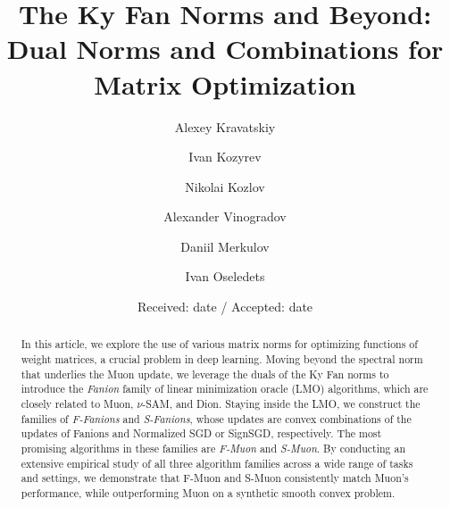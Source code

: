 \documentclass[smallextended,referee,envcountsect]{svjour3}
\begin{document}
\title{The Ky Fan Norms and Beyond: Dual Norms and Combinations for Matrix Optimization}

\author{Alexey Kravatskiy \and Ivan Kozyrev \and Nikolai Kozlov \and Alexander Vinogradov \and Daniil Merkulov \and Ivan Oseledets}


\date{Received: date / Accepted: date}

\maketitle

\begin{abstract}
   In this article, we explore the use of various matrix norms for optimizing functions of weight matrices, a crucial problem in deep learning. Moving beyond the spectral norm that underlies the Muon update, we leverage the duals of the Ky Fan norms to introduce the \emph{Fanion} family of linear minimization oracle (LMO) algorithms, which are closely related to Muon, $\nu$-SAM, and Dion. Staying inside the LMO, we construct the families of \emph{F-Fanions} and \emph{S-Fanions}, whose updates are convex combinations of the updates of Fanions and Normalized SGD or SignSGD, respectively. The most promising algorithms in these families are \emph{F-Muon} and \emph{S-Muon}. By conducting an extensive empirical study of all three algorithm families across a wide range of tasks and settings, we demonstrate that F-Muon and S-Muon consistently match Muon's performance, while outperforming Muon on a synthetic smooth convex problem.
 \end{abstract}
\end{document}
